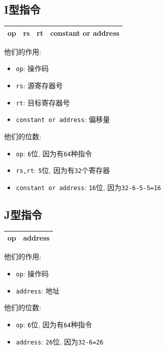 \subsection{I型指令}
\begin{table}[H]
\centering
\begin{tabularx}{\textwidth}{|Z|Z|Z|p{15em}<{\centering}|}
\hline
op & rs & rt & constant or address \\
\hline
\end{tabularx}
\end{table}\par
他们的作用:
\begin{itemize}
\item \verb|op|: 操作码
\item \verb|rs|: 源寄存器号
\item \verb|rt|: 目标寄存器号
\item \verb|constant or address|: 偏移量
\end{itemize}\par
他们的位数:
\begin{itemize}
\item \verb|op|: \verb|6|位, 因为有\verb|64|种指令
\item \verb|rs,rt|: \verb|5|位, 因为有\verb|32|个寄存器
\item \verb|constant or address|: \verb|16|位, 因为\verb|32-6-5-5=16|
\end{itemize}
\subsection{J型指令}
\begin{table}[H]
\centering
\begin{tabularx}{\textwidth}{|Z|Z|}
\hline
op & address \\
\hline
\end{tabularx}
\end{table}\par
他们的作用:
\begin{itemize}
\item \verb|op|: 操作码
\item \verb|address|: 地址
\end{itemize}\par
他们的位数:
\begin{itemize}
\item \verb|op|: \verb|6|位, 因为有\verb|64|种指令
\item \verb|address|: \verb|26|位, 因为\verb|32-6=26|
\end{itemize}
